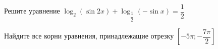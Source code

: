 \begin{ex}
	\begin{condition}
		\begin{enumcols}[label=\asbuk*)]
			\item Решите уравнение \( \log_2 (\sin 2x )+\log_{\dfrac{1}{2}} (- \sin x)  = \dfrac{1}{2} \)
			\item Найдите все корни уравнения, принадлежащие отрезку \( \left[-5\pi;-\dfrac{7\pi}{2}\right] \)
		\end{enumcols}
	\end{condition}
\end{ex}